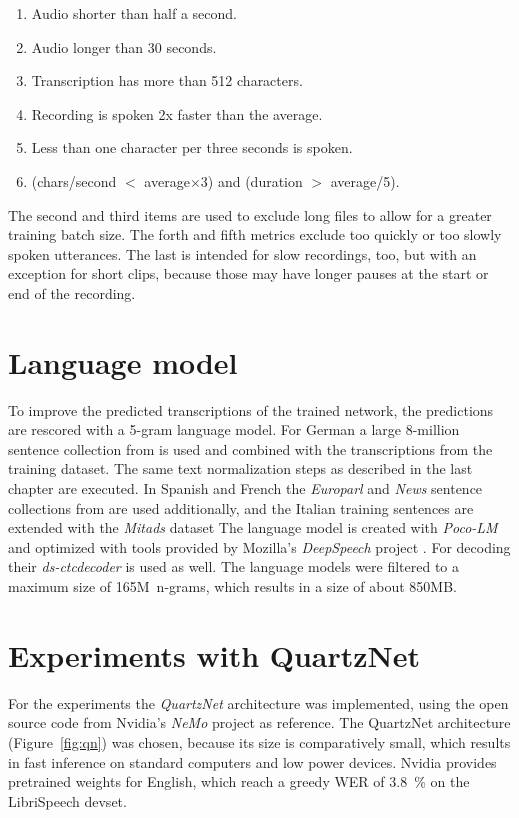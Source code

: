 \begin{enumerate}
	\itemsep0.1em
	\item Audio shorter than half a second.
	\item Audio longer than 30 seconds.
	\item Transcription has more than 512 characters.
	\item Recording is spoken 2x faster than the average.
	\item Less than one character per three seconds is spoken.
	\item (chars/second $<$ average$\times$3) and (duration $>$ average/5).
\end{enumerate}

The second and third items are used to exclude long files to allow for a greater training batch size. The forth and fifth metrics exclude too quickly or too slowly spoken utterances. The last is intended for slow recordings, too, but with an exception for short clips, because those may have longer pauses at the start or end of the recording.

\section{Language model}
\label{sec:langm}

To improve the predicted transcriptions of the trained network, the predictions are rescored with a 5-gram language model. For German a large 8-million sentence collection from \cite{SENDE} is used and combined with the transcriptions from the training dataset. The same text normalization steps as described in the last chapter are executed. In Spanish and French the \textit{Europarl} and \textit{News} sentence collections from \cite{STATMT} are used additionally, and the Italian training sentences are extended with the \textit{Mitads} dataset \cite{MITADS} The language model is created with \textit{Poco-LM} \cite{POCOLM} and optimized with tools provided by Mozilla's \textit{DeepSpeech} project \cite{DEPSPE}. For decoding their \textit{ds-ctcdecoder} is used as well. The language models were filtered to a maximum size of \mbox{165M n-grams}, which results in a size of about 850MB.

\section{Experiments with QuartzNet}
\label{sec:exqn}

For the experiments the \textit{QuartzNet} architecture \cite{QNET} was implemented, using the open source code from Nvidia's \textit{NeMo} project \cite{NEMO} as reference.
The QuartzNet architecture (Figure~\ref{fig:qn}) was chosen, because its size is comparatively small, which results in fast inference on standard computers and low power devices. Nvidia provides pretrained weights for English, which reach a greedy WER of \SI{3.8}{\percent} on the LibriSpeech devset.

